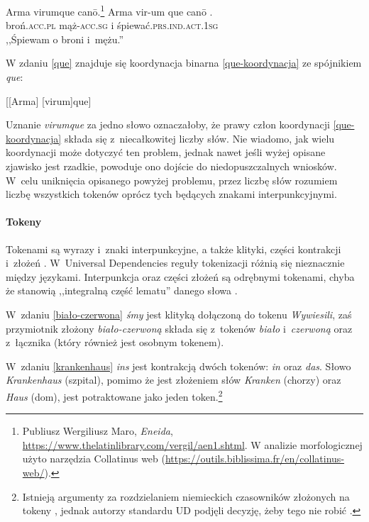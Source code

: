 \begin{exe}
\ex  \label{que}
Arma virumque canō.\footnote{Publiusz Wergiliusz Maro, \textit{Eneida},
\url{https://www.thelatinlibrary.com/vergil/aen1.shtml}. W analizie morfologicznej użyto narzędzia Collatinus web (\url{https://outils.biblissima.fr/en/collatinus-web/}).}
\gll Arma vir-um que canō . \\
broń\textsc{.acc.pl} mąż\textsc{-acc.sg} i śpiewać\textsc{.prs.ind.act.1sg} \\
\glt ,,Śpiewam o broni i~mężu.''
\end{exe}

W zdaniu \eqref{que} znajduje się koordynacja binarna \eqref{que-koordynacja} ze spójnikiem \textit{que}:

\begin{exe}
\ex \label{que-koordynacja}
{[[Arma] [virum]que]}
\end{exe}

Uznanie \textit{virumque} za jedno słowo oznaczałoby, że prawy człon koordynacji \eqref{que-koordynacja} składa się z~niecałkowitej liczby słów. Nie wiadomo, jak wielu koordynacji może dotyczyć ten problem, jednak nawet jeśli wyżej opisane zjawisko jest rzadkie, powoduje ono dojście do niedopuszczalnych wniosków. W~celu uniknięcia opisanego powyżej problemu, przez liczbę słów rozumiem liczbę wszystkich tokenów oprócz tych będących znakami interpunkcyjnymi. 

\paragraph{Tokeny}
Tokenami są wyrazy i~znaki interpunkcyjne, a także klityki, części kontrakcji i~złożeń \citep{riedl2018using}. W~Universal Dependencies reguły tokenizacji różnią się nieznacznie między językami. Interpunkcja oraz części złożeń są odrębnymi tokenami, chyba że stanowią ,,integralną część lematu'' danego słowa \citep{de2021universal}.

W~zdaniu \eqref{biało-czerwona} \textit{śmy} jest klityką dołączoną do tokenu \textit{Wywiesili}, zaś przymiotnik złożony \textit{biało-czerwoną} składa się z~tokenów \textit{biało} i~\textit{czerwoną} oraz z~łącznika (który również jest osobnym tokenem).

W~zdaniu \eqref{krankenhaus} \textit{ins} jest kontrakcją dwóch tokenów: \textit{in} oraz \textit{das}. Słowo \textit{Krankenhaus} (szpital), pomimo że jest złożeniem słów \textit{Kranken} (chorzy) oraz \textit{Haus} (dom), jest potraktowane jako jeden token.\footnote{Istnieją argumenty za rozdzielaniem  niemieckich czasowników złożonych na tokeny \citep{riedl2018using}, jednak autorzy standardu UD podjęli decyzję, żeby tego nie robić \citep{de2021universal}. }

